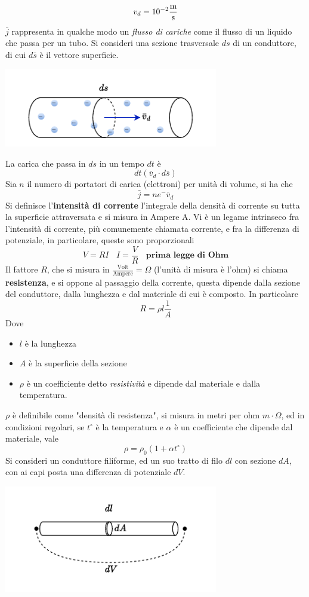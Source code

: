 \documentclass[10pt, letterpaper]{report}
\begin{document}
$$ v_d=10^{-2}\frac{\text m}{\text s}$$
$\bar j$ rappresenta in qualche modo un \textit{flusso di cariche} come il flusso di un liquido che passa per un tubo. Si consideri una sezione trasversale $ds$ di un conduttore, di cui $d\bar s$ è il vettore superficie.\begin{center}
    \includegraphics[width=0.7\textwidth]{images/correnteAttraversaSezione.drawio.pdf}
\end{center}
La carica che passa in $ds$ in un tempo $dt$ è $$dt(\bar v_d\cdot d\bar s)$$
Sia $n$ il numero di portatori di carica (elettroni) per unità di volume, si ha che 
$$ \bar j = ne^-\bar v_d$$
Si definisce l'\textbf{intensità di corrente} l'integrale della densità di corrente su tutta la superficie attraversata 
e si misura in Ampere A. \acc 
Vi è un legame intrinseco fra l'intensità di corrente, più comunemente chiamata corrente, e fra la differenza di potenziale, in particolare, queste sono proporzionali 
$$ V=RI\ \ \ \ I=\frac{V}{R}\ \ \ \ \textbf{prima legge di Ohm}$$
Il fattore $R$, che si misura in $\frac{\text{Volt}}{\text{Ampere}}=\Omega$ (l'unità di misura è l'ohm) si chiama \textbf{resistenza}, e si oppone al passaggio della corrente, questa dipende dalla sezione del conduttore, dalla lunghezza e dal materiale di cui è composto. In particolare 
$$ R=\rho l\frac{1}{A}$$
Dove \begin{itemize}
    \item $l$ è la lunghezza 
    \item $A$ è la superficie della sezione 
    \item $\rho$ è un coefficiente detto \textit{resistività} e dipende dal materiale e dalla temperatura.
\end{itemize}
$\rho$ è definibile come "densità di resistenza", si misura in metri per ohm $m\cdot\Omega$, ed in condizioni regolari, se $t^\circ$ è la temperatura e $\alpha$ è un coefficiente che dipende dal materiale, vale 
$$ \rho=\rho_0(1+\alpha t^\circ)$$
Si consideri un conduttore filiforme, ed un suo tratto di filo $dl$ con sezione $dA$, con ai capi posta una differenza di potenziale $dV$.\begin{center}
    \includegraphics[width=0.7\textwidth]{images/tratttofilo.pdf}
\end{center}
\end{document}
